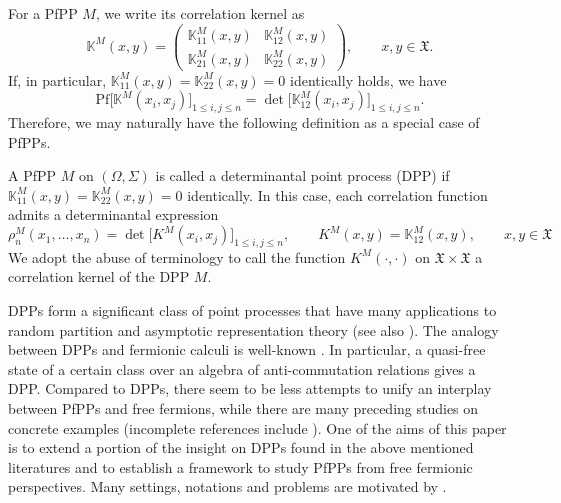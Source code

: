 \documentclass[11pt]{article}
\numberwithin{equation}{section}
\numberwithin{equation}{section}
\newcommand{\mfrak}[1]{\mathfrak{#1}}
\newcommand{\mbb}[1]{\mathbb{#1}}
\newcommand{\mrm}[1]{\mathrm{#1}}
\begin{document}
For a PfPP $M$, we write its correlation kernel as
\begin{equation*}
	\mbb{K}^{M}(x,y)
	=\left(
	\begin{matrix}
		\mbb{K}_{11}^{M}(x,y) & \mbb{K}_{12}^{M}(x,y) \\
		\mbb{K}_{21}^{M}(x,y) & \mbb{K}_{22}^{M}(x,y)
	\end{matrix}
	\right),\qquad x,y\in\mfrak{X}.
\end{equation*}
If, in particular, $\mbb{K}_{11}^{M}(x,y)=\mbb{K}_{22}^{M}(x,y)=0$ identically holds, we have
\begin{equation*}
	\mrm{Pf}\big[\mbb{K}^{M}(x_{i},x_{j})\big]_{1\le i,j\le n}=\det \big[\mbb{K}_{12}^{M}(x_{i},x_{j})\big]_{1\le i,j\le n}.
\end{equation*}
Therefore, we may naturally have the following definition as a special case of PfPPs.

\begin{Definition}
A PfPP $M$ on $(\Omega,\Sigma)$ is called a determinantal point process (DPP) if $\mbb{K}^{M}_{11}(x,y)\allowbreak =\mbb{K}^{M}_{22}(x,y)=0$ identically.
In this case, each correlation function admits a determinantal expression
\begin{equation*}
	\rho_{n}^{M}(x_{1},\dots, x_{n})=\det \big[K^{M}(x_{i},x_{j})\big]_{1\le i,j\le n},\qquad K^{M}(x,y)=\mbb{K}^{M}_{12}(x,y),\qquad x,y\in\mfrak{X}
\end{equation*}
We adopt the abuse of terminology to call the function $K^{M}(\cdot,\cdot)$ on $\mfrak{X}\times\mfrak{X}$ a correlation kernel of the DPP $M$.
\end{Definition}

DPPs form a significant class of point processes that have many applications to random partition and asymptotic representation theory \cite{Borodin1998a, BorodinOlshanski1998a, Borodin1998b,BorodinOlshanski1998b,Okounkov2001,Olshanski1998, Olshanski2003} (see also \cite{Borodin2011,BenHoughKrishnapurPeresVirag2006, Lyons2003, Soshnikov2000}). The analogy between DPPs and fermionic calculi is well-known \cite{Lytvynov2002,LytvynovMei2007,Olshanski2020, ShiraiTakahashi2003a, ShiraiTakahashi2003b, Spohn1987}. In particular, a quasi-free state of a certain class over an algebra of anti-commutation relations gives a DPP.
Compared to DPPs, there seem to be less attempts to unify an interplay between PfPPs and free fermions, while there are many preceding studies on concrete examples (incomplete references include \cite{BorodinRains2005, Ferrari2004, KatoriTanemura2007,Matsumoto2005, MatsumotoShirai2013,Nagao2007,Rains2000,Vuletic2007,WangLi2019}).
One of the aims of this paper is to extend a portion of the insight on DPPs found in the above mentioned literatures and to establish a framework to study PfPPs from free fermionic perspectives. Many settings, notations and problems are motivated by \cite{Olshanski2020}.
\end{document}
